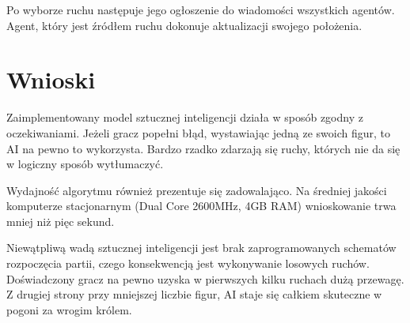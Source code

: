 \documentclass[a4paper,12pt,oneside,notitlepage,onecolumn]{article}
\begin{document}
Po wyborze ruchu następuje jego ogłoszenie do wiadomości wszystkich agentów.
Agent, który jest źródłem ruchu dokonuje aktualizacji swojego położenia.

\section{Wnioski}
Zaimplementowany model sztucznej inteligencji działa w sposób zgodny z oczekiwaniami.
Jeżeli gracz popełni błąd, wystawiając jedną ze swoich figur, to AI na pewno to wykorzysta.
Bardzo rzadko zdarzają się ruchy, których nie da się w logiczny sposób wytłumaczyć.

Wydajność algorytmu również prezentuje się zadowalająco.
Na średniej jakości komputerze stacjonarnym (Dual Core 2600MHz, 4GB RAM) wnioskowanie trwa mniej niż pięc sekund.

Niewątpliwą wadą sztucznej inteligencji jest brak zaprogramowanych schematów rozpoczęcia partii, czego konsekwencją jest wykonywanie losowych ruchów.
Doświadczony gracz na pewno uzyska w pierwszych kilku ruchach dużą przewagę.
Z drugiej strony przy mniejszej liczbie figur, AI staje się całkiem skuteczne w pogoni za wrogim królem.
\end{document}
